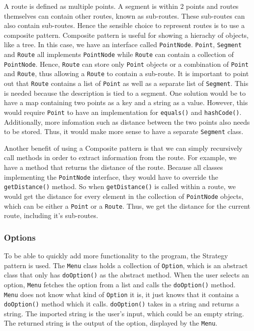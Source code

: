 \documentclass[a4paper, 12pt, titlepage]{article}
\newcommand{\code}[1]{\small\texttt{#1}\normalsize}
\begin{document}
A route is defined as multiple points. A segment is within 2 points and routes
themselves can contain other routes, known as sub-routes. These sub-routes can
also contain sub-routes. Hence the sensible choice to represent routes is to
use a composite pattern. Composite pattern is useful for showing a hierachy of
objects, like a tree. In this case, we have an interface called
\code{PointNode}. \code{Point}, \code{Segment} and \code{Route} all implements
\code{PointNode} while \code{Route} can contain a collection of
\code{PointNode}. Hence, \code{Route} can store only \code{Point} objects or a
combination of \code{Point} and \code{Route}, thus allowing a \code{Route} to
contain a sub-route. It is important to point out that \code{Route} contains a
list of \code{Point} as well as a separate list of \code{Segment}. This is
needed because the description is tied to a segment. One solution would be to
have a map containing two points as a key and a string as a value. However,
this would require \code{Point} to have an implementation for \code{equals()}
and \code{hashCode()}. Additionally, more infomation such as distance between
the two points also needs to be stored. Thus, it would make more sense to have
a separate \code{Segment} class.

Another benefit of using a Composite pattern is that we can simply recursively
call methods in order to extract information from the route. For example, we
have a method that returns the distance of the route. Because all classes
implementing the \code{PointNode} interface, they would have to override the
\code{getDistance()} method. So when \code{getDistance()} is called within a
route, we would get the distance for every element in the collection of
\code{PointNode} objects, which can be either a \code{Point} or a \code{Route}.
Thus, we get the distance for the current route, including it's sub-routes.


\subsubsection{Options}

To be able to quickly add more functionality to the program, the Strategy
pattern is used. The \code{Menu} class holds a collection of \code{Option},
which is an abstract class that only has \code{doOption()} as the abstract
method. When the user selects an option, \code{Menu} fetches the option from a
list and calls the \code{doOption()} method. \code{Menu} does not know what
kind of \code{Option} it is, it just knows that it contains a \code{doOption()}
method which it calls. \code{doOption()} takes in a string and returns a
string. The imported string is the user's input, which could be an empty
string. The returned string is the output of the option, displayed by the
\code{Menu}.
\end{document}
